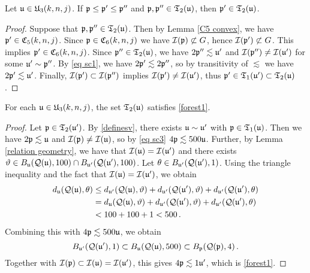 {\begin{lemma}
    \label{C6 convex}
    Let $\mathfrak u \in \mathfrak U_3(k,n,j)$. If $\mathfrak p \le \mathfrak p' \le \mathfrak p''$ and $\mathfrak p, \mathfrak p'' \in \mathfrak{T}_2(\mathfrak u)$, then $\mathfrak p' \in \mathfrak{T}_2(\mathfrak u)$.
\end{lemma}

\begin{proof}
    Suppose that $\mathfrak p, \mathfrak p'' \in \mathfrak{T}_2(\mathfrak u)$. Then by Lemma \ref{C5 convex}, we have
$\mathfrak p' \in \mathfrak C_5(k,n,j)$. Since $\mathfrak p \in \mathfrak C_6(k,n,j)$ we have $\mathcal{I}(\mathfrak p) \not\subset G$, hence $\mathcal{I}(\mathfrak p') \not \subset G$. This implies $\mathfrak p' \in \mathfrak C_6(k,n,j)$. Since $\mathfrak p'' \in \mathfrak{T}_2(\mathfrak u)$, we have $2\mathfrak p'' \lesssim \mathfrak u'$ and $\mathcal{I}(\mathfrak p'')\ne\mathcal{I}(\mathfrak u')$ for some $\mathfrak u' \sim \mathfrak p''$. By \eqref{eq sc1}, we have $2\mathfrak p' \lesssim 2\mathfrak p''$, so by transitivity of $\lesssim$ we have $2\mathfrak p' \lesssim \mathfrak u'$. Finally, $\mathcal{I}(\mathfrak p') \subset \mathcal{I}(\mathfrak p'')$ implies $\mathcal{I}(\mathfrak p') \ne \mathcal{I}(\mathfrak u')$, thus $\mathfrak p' \in \mathfrak{T}_1(\mathfrak u') \subset \mathfrak{T}_2(\mathfrak u)$.
\end{proof}


\begin{lemma}
    \label{forest geometry}
    For each $\mathfrak u\in \mathfrak U_3(k,n,j)$,
    the set $\mathfrak{T}_2(\mathfrak u)$
    satisfies \eqref{forest1}.
\end{lemma}
\begin{proof}
    Let $\mathfrak p \in \mathfrak{T}_2(\mathfrak u')$. By \eqref{definesv}, there exists $\mathfrak u \sim \mathfrak u'$ with $\mathfrak p \in \mathfrak{T}_1(\mathfrak u)$. Then we have $2\mathfrak p \lesssim \mathfrak u$ and $\mathcal{I}(\mathfrak p) \ne \mathcal{I}(\mathfrak u)$, so by \eqref{eq sc3} $4\mathfrak p \lesssim 500\mathfrak u$.
    Further, by Lemma \ref{relation geometry}, we have that $\mathcal{I}(\mathfrak u) = \mathcal{I}(\mathfrak u')$ and there exists $\vartheta \in B_{\mathfrak u}(\mathcal{Q}(\mathfrak u),100) \cap B_{\mathfrak u'}(\mathcal{Q}(\mathfrak u'),100)$.
    Let $\theta \in B_{\mathfrak u'}(\mathcal{Q}(\mathfrak u'), 1)$.
    Using the triangle inequality and the fact that $\mathcal{I}(\mathfrak u)  =\mathcal{I}(\mathfrak u')$, we obtain
    \begin{align*}
        d_{\mathfrak u}(\mathcal{Q}(\mathfrak u), \theta) &\le d_{\mathfrak u'}(\mathcal{Q}(\mathfrak u), \vartheta) + d_{\mathfrak u'}(\mathcal{Q}(\mathfrak u'), \vartheta) + d_{\mathfrak u'}(\mathcal{Q}(\mathfrak u'), \theta)\\
        &= d_{\mathfrak u}(\mathcal{Q}(\mathfrak u), \vartheta) + d_{\mathfrak u'}(\mathcal{Q}(\mathfrak u'), \vartheta) + d_{\mathfrak u'}(\mathcal{Q}(\mathfrak u'), \theta)\\
        &< 100 + 100 + 1 < 500\,.
    \end{align*}
    Combining this with $4\mathfrak p \lesssim 500\mathfrak u$, we obtain
    $$
        B_{\mathfrak u'}(\mathcal{Q}(\mathfrak u'), 1) \subset B_{\mathfrak u}(\mathcal{Q}(\mathfrak u), 500) \subset B_{\mathfrak p}(\mathcal{Q}(\mathfrak p), 4)\,.
    $$
    Together with $\mathcal{I}(\mathfrak p) \subset \mathcal{I}(\mathfrak u) = \mathcal{I}(\mathfrak u')$, this gives $4\mathfrak p \lesssim 1\mathfrak u'$, which is \eqref{forest1}.
\end{proof}

}
